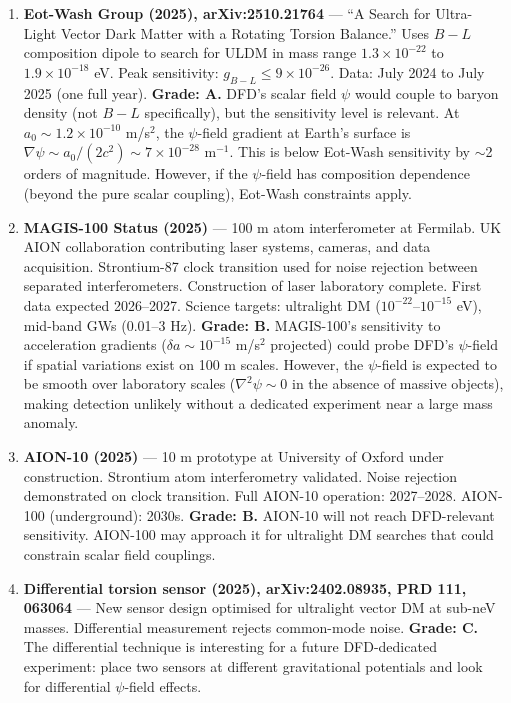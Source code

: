\documentclass[11pt,a4paper]{article}
\begin{document}
\begin{enumerate}

\item \textbf{Eot-Wash Group (2025), arXiv:2510.21764} --- ``A Search for Ultra-Light Vector Dark Matter with a Rotating Torsion Balance.'' Uses $B-L$ composition dipole to search for ULDM in mass range $1.3 \times 10^{-22}$ to $1.9 \times 10^{-18}$ eV. Peak sensitivity: $g_{B-L} \leq 9 \times 10^{-26}$. Data: July 2024 to July 2025 (one full year). \textbf{Grade: A.} DFD's scalar field $\psi$ would couple to baryon density (not $B-L$ specifically), but the sensitivity level is relevant. At $a_0 \sim 1.2 \times 10^{-10}$ m/s$^2$, the $\psi$-field gradient at Earth's surface is $\nabla\psi \sim a_0/(2c^2) \sim 7 \times 10^{-28}$ m$^{-1}$. This is below Eot-Wash sensitivity by $\sim$2 orders of magnitude. However, if the $\psi$-field has composition dependence (beyond the pure scalar coupling), Eot-Wash constraints apply.

\item \textbf{MAGIS-100 Status (2025)} --- 100 m atom interferometer at Fermilab. UK AION collaboration contributing laser systems, cameras, and data acquisition. Strontium-87 clock transition used for noise rejection between separated interferometers. Construction of laser laboratory complete. First data expected 2026--2027. Science targets: ultralight DM ($10^{-22}$--$10^{-15}$ eV), mid-band GWs (0.01--3 Hz). \textbf{Grade: B.} MAGIS-100's sensitivity to acceleration gradients ($\delta a \sim 10^{-15}$ m/s$^2$ projected) could probe DFD's $\psi$-field if spatial variations exist on 100 m scales. However, the $\psi$-field is expected to be smooth over laboratory scales ($\nabla^2 \psi \sim 0$ in the absence of massive objects), making detection unlikely without a dedicated experiment near a large mass anomaly.

\item \textbf{AION-10 (2025)} --- 10 m prototype at University of Oxford under construction. Strontium atom interferometry validated. Noise rejection demonstrated on clock transition. Full AION-10 operation: 2027--2028. AION-100 (underground): 2030s. \textbf{Grade: B.} AION-10 will not reach DFD-relevant sensitivity. AION-100 may approach it for ultralight DM searches that could constrain scalar field couplings.

\item \textbf{Differential torsion sensor (2025), arXiv:2402.08935, PRD 111, 063064} --- New sensor design optimised for ultralight vector DM at sub-neV masses. Differential measurement rejects common-mode noise. \textbf{Grade: C.} The differential technique is interesting for a future DFD-dedicated experiment: place two sensors at different gravitational potentials and look for differential $\psi$-field effects.

\end{enumerate}
\end{document}
